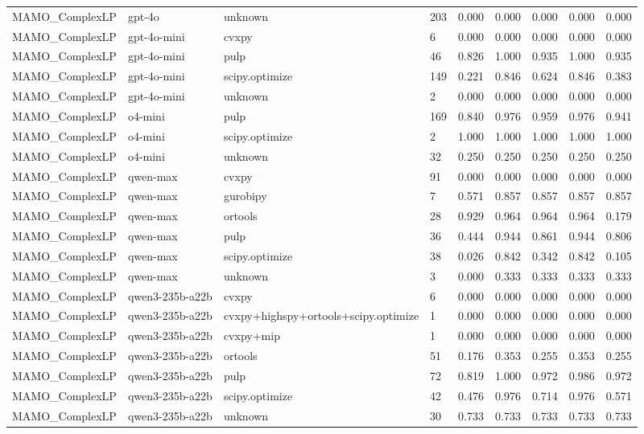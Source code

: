 \begin{table}[t]
\begin{tabular}{lllllllll}
MAMO\_ComplexLP & gpt-4o & unknown & 203 & 0.000 & 0.000 & 0.000 & 0.000 & 0.000 \\
MAMO\_ComplexLP & gpt-4o-mini & cvxpy & 6 & 0.000 & 0.000 & 0.000 & 0.000 & 0.000 \\
MAMO\_ComplexLP & gpt-4o-mini & pulp & 46 & 0.826 & 1.000 & 0.935 & 1.000 & 0.935 \\
MAMO\_ComplexLP & gpt-4o-mini & scipy.optimize & 149 & 0.221 & 0.846 & 0.624 & 0.846 & 0.383 \\
MAMO\_ComplexLP & gpt-4o-mini & unknown & 2 & 0.000 & 0.000 & 0.000 & 0.000 & 0.000 \\
MAMO\_ComplexLP & o4-mini & pulp & 169 & 0.840 & 0.976 & 0.959 & 0.976 & 0.941 \\
MAMO\_ComplexLP & o4-mini & scipy.optimize & 2 & 1.000 & 1.000 & 1.000 & 1.000 & 1.000 \\
MAMO\_ComplexLP & o4-mini & unknown & 32 & 0.250 & 0.250 & 0.250 & 0.250 & 0.250 \\
MAMO\_ComplexLP & qwen-max & cvxpy & 91 & 0.000 & 0.000 & 0.000 & 0.000 & 0.000 \\
MAMO\_ComplexLP & qwen-max & gurobipy & 7 & 0.571 & 0.857 & 0.857 & 0.857 & 0.857 \\
MAMO\_ComplexLP & qwen-max & ortools & 28 & 0.929 & 0.964 & 0.964 & 0.964 & 0.179 \\
MAMO\_ComplexLP & qwen-max & pulp & 36 & 0.444 & 0.944 & 0.861 & 0.944 & 0.806 \\
MAMO\_ComplexLP & qwen-max & scipy.optimize & 38 & 0.026 & 0.842 & 0.342 & 0.842 & 0.105 \\
MAMO\_ComplexLP & qwen-max & unknown & 3 & 0.000 & 0.333 & 0.333 & 0.333 & 0.333 \\
MAMO\_ComplexLP & qwen3-235b-a22b & cvxpy & 6 & 0.000 & 0.000 & 0.000 & 0.000 & 0.000 \\
MAMO\_ComplexLP & qwen3-235b-a22b & cvxpy+highspy+ortools+scipy.optimize & 1 & 0.000 & 0.000 & 0.000 & 0.000 & 0.000 \\
MAMO\_ComplexLP & qwen3-235b-a22b & cvxpy+mip & 1 & 0.000 & 0.000 & 0.000 & 0.000 & 0.000 \\
MAMO\_ComplexLP & qwen3-235b-a22b & ortools & 51 & 0.176 & 0.353 & 0.255 & 0.353 & 0.255 \\
MAMO\_ComplexLP & qwen3-235b-a22b & pulp & 72 & 0.819 & 1.000 & 0.972 & 0.986 & 0.972 \\
MAMO\_ComplexLP & qwen3-235b-a22b & scipy.optimize & 42 & 0.476 & 0.976 & 0.714 & 0.976 & 0.571 \\
MAMO\_ComplexLP & qwen3-235b-a22b & unknown & 30 & 0.733 & 0.733 & 0.733 & 0.733 & 0.733 \\

\end{tabular}
\end{table}
